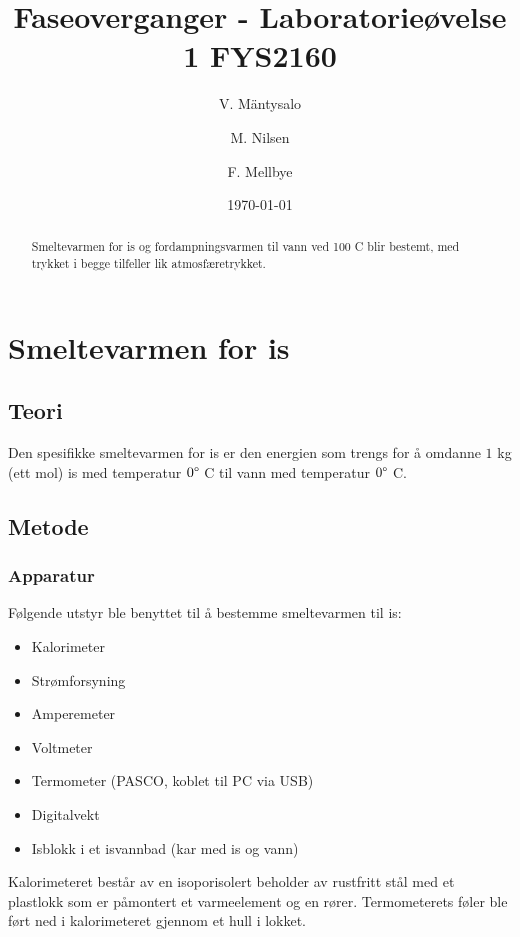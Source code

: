 \documentclass[aps,reprint]{revtex4-1}
\begin{document}
\title{Faseoverganger - Laboratorieøvelse 1 FYS2160}
\author{V. Mäntysalo}
\author{M. Nilsen}
\author{F. Mellbye}
\date{\today}

\begin{abstract}
Smeltevarmen for is og fordampningsvarmen til vann ved 100 C blir bestemt, med trykket i begge tilfeller lik atmosfæretrykket.
\end{abstract}
\maketitle
\makeatletter
\let\toc@pre\relax
\let\toc@post\relax
\makeatother
\section{Smeltevarmen for is}
\subsection{Teori}
Den spesifikke smeltevarmen for is er den energien som trengs for å omdanne
$1$ kg (ett mol) is med temperatur $0 \degree$ C til vann med temperatur $0\degree$ C.
\subsection{Metode}
\subsubsection{Apparatur}
Følgende utstyr ble benyttet til å bestemme smeltevarmen til is:
\begin{itemize}
  \item Kalorimeter
  \item Strømforsyning
  \item Amperemeter
  \item Voltmeter
  \item Termometer (PASCO, koblet til PC via USB)
  \item Digitalvekt
  \item Isblokk i et isvannbad (kar med is og vann)
\end{itemize}
Kalorimeteret består av en isoporisolert beholder av rustfritt stål med et plastlokk
som er påmontert et varmeelement og en rører. Termometerets føler ble ført ned
i kalorimeteret gjennom et hull i lokket.
\end{document}
